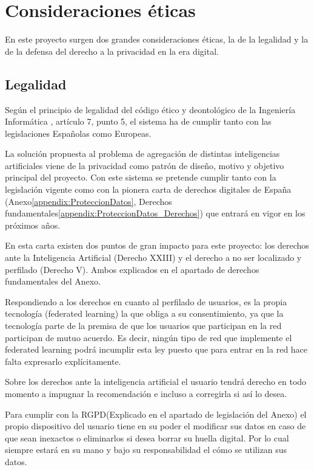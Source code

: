 \section{Consideraciones éticas}

En este proyecto surgen dos grandes consideraciones éticas, la de la legalidad y la de la defensa del derecho a la privacidad en la era digital.

\subsection{Legalidad}

Según el principio de legalidad del código ético y deontológico de la Ingeniería Informática \autocite{CodigoEticoDeontologicoa}, artículo 7, punto 5, el sistema ha de cumplir tanto con las legislaciones Españolas como Europeas. 

La solución propuesta al problema de agregación de distintas inteligencias artificiales viene de la privacidad como patrón de diseño, motivo y objetivo principal del proyecto. Con este sistema se pretende cumplir tanto con la legislación vigente como con la pionera carta de derechos digitales de España (Anexo\ref{appendix:ProteccionDatos}, Derechos fundamentales\ref{appendix:ProteccionDatos_Derechos}) que entrará en vigor en los próximos años. 

En esta carta existen dos puntos de gran impacto para este proyecto: los derechos ante la Inteligencia Artificial (Derecho XXIII) y el derecho a no ser localizado y perfilado (Derecho V). Ambos explicados en el apartado de derechos fundamentales del Anexo.

Respondiendo a los derechos en cuanto al perfilado de usuarios, es la propia tecnología (federated learning) la que obliga a su consentimiento, ya que la tecnología parte de la premisa de que los usuarios que participan en la red participan de mutuo acuerdo. Es decir, ningún tipo de red que implemente el federated learning podrá incumplir esta ley puesto que para entrar en la red hace falta expresarlo explícitamente.

Sobre los derechos ante la inteligencia artificial el usuario tendrá derecho en todo momento a impugnar la recomendación e incluso a corregirla si así lo desea.

Para cumplir con la RGPD(Explicado en el apartado de legislación del Anexo) el propio dispositivo del usuario tiene en su poder el modificar sus datos en caso de que sean inexactos o eliminarlos si desea borrar su huella digital. Por lo cual siempre estará en su mano y bajo su responsabilidad el cómo se utilizan sus datos.


